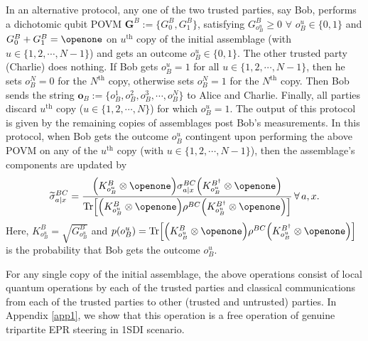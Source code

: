 \documentclass[reprint,superscriptaddress,nofootinbib,amsmath,amssymb,aps,pra,longbibliography]{revtex4-1}
\begin{document}
In an alternative protocol, any one of the two trusted parties, say Bob, performs a dichotomic qubit POVM  $\textbf{G}^B:=\{G_{0}^B,G_{1}^B \}$, satisfying $G^B_{o^u_B} \ge 0$ $\forall$ $o^u_B \in \{0,1\}$ and $G^B_0 + G^B_1 = \openone$ on $u^{\text{th}}$ copy of the initial assemblage (with $u \in \{1, 2, \cdots, N-1\}$) and gets an outcome $o^u_B \in \{ 0, 1\}$. The other trusted party (Charlie) does nothing. If Bob gets $o^u_B=1$ for all $u \in \{1, 2, \cdots, N-1\}$, then he sets $o^N_B=0$ for the $N^{\text{th}}$ copy, otherwise sets $o^N_B=1$ for the $N^{\text{th}}$ copy. Then Bob sends the string $\textbf{o}_B:=\{o^1_B, o^2_B, o^3_B, \cdots, o^{N}_B\}$ to Alice and Charlie. Finally, all parties discard $u^{\text{th}}$ copy ($u \in \{1, 2, \cdots, N\}$) for which $o^u_B = 1$. The output of this protocol is given by the remaining  copies of assemblages post Bob's measurements. In this protocol, when Bob gets the outcome $o^u_B$ contingent upon performing the above POVM on any of the $u^{\text{th}}$ copy (with $u \in \{1, 2, \cdots, N-1\}$), then the assemblage’s components are updated by 
\begin{align}
    \widetilde{\sigma}_{a|x}^{BC} = \frac{\Big(K_{o^u_B}^B \otimes \openone \Big) \sigma_{a|x}^{BC} \Big(K_{o^u_B}^{B^{\dagger}} \otimes \openone \Big)}{\text{Tr} \Big[ \Big(K_{o^u_B}^B \otimes \openone \Big) \rho^{BC} \Big(K_{o^u_B}^{B^{\dagger}} \otimes \openone \Big) \Big]} \, \forall \, a,x.
    \label{finalass2}
\end{align}
Here, $K_{o^u_B}^B = \sqrt{G_{o^u_B}^B}$ and $p(o^u_B) = \text{Tr} \Big[ \Big(K_{o^u_B}^B \otimes \openone \Big) \rho^{BC} \Big(K_{o^u_B}^{B^{\dagger}} \otimes \openone \Big) \Big]$ is the probability that Bob gets the outcome $o^u_B$.

For any single copy of the initial assemblage, the above operations consist of local quantum operations by each of the trusted parties and classical communications from each of the trusted parties to other (trusted and untrusted) parties. In Appendix \ref{app1}, we show that this operation is a free operation of genuine tripartite EPR steering in 1SDI scenario.%
\end{document}
